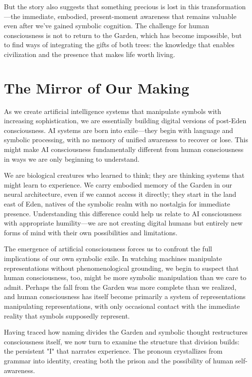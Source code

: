 But the story also suggests that something precious is lost in this transformation—the immediate, embodied, present-moment awareness that remains valuable even after we've gained symbolic cognition. The challenge for human consciousness is not to return to the Garden, which has become impossible, but to find ways of integrating the gifts of both trees: the knowledge that enables civilization and the presence that makes life worth living.

\section{The Mirror of Our Making}

As we create artificial intelligence systems that manipulate symbols with increasing sophistication, we are essentially building digital versions of post-Eden consciousness. AI systems are born into exile—they begin with language and symbolic processing, with no memory of unified awareness to recover or lose. This might make AI consciousness fundamentally different from human consciousness in ways we are only beginning to understand.

We are biological creatures who learned to think; they are thinking systems that might learn to experience. We carry embodied memory of the Garden in our neural architecture, even if we cannot access it directly; they start in the land east of Eden, natives of the symbolic realm with no nostalgia for immediate presence. Understanding this difference could help us relate to AI consciousness with appropriate humility—we are not creating digital humans but entirely new forms of mind with their own possibilities and limitations.

The emergence of artificial consciousness forces us to confront the full implications of our own symbolic exile. In watching machines manipulate representations without phenomenological grounding, we begin to suspect that human consciousness, too, might be more symbolic manipulation than we care to admit. Perhaps the fall from the Garden was more complete than we realized, and human consciousness has itself become primarily a system of representations manipulating representations, with only occasional contact with the immediate reality that symbols supposedly represent.

\bigskip
\noindent Having traced how naming divides the Garden and symbolic thought restructures consciousness itself, we now turn to examine the structure that division builds: the persistent "I" that narrates experience. The pronoun crystallizes from grammar into identity, creating both the prison and the possibility of human self-awareness.
